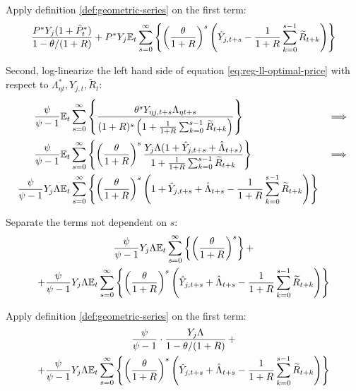 \documentclass[
	thesis.tex
	]{subfiles}
\begin{document}
Apply definition \ref{def:geometric-series} on the first term:
\begin{align}
	\frac{ P^\ast Y_{j} ( 1 + \hat{P}_t^\ast ) }{1-\theta /(1+R)} + P^\ast Y_{j} {\mathbb{E}_{t}} \sum_{s=0}^{\infty} \left\{ \left( \frac{\theta}{1 + R} \right)^s \left( \hat{Y}_{j,t+s} - \frac{1}{1 + R} \sum_{k=0}^{s-1} \widetilde{R}_{t+k} \right) \right\} \nonumber
\end{align}

Second, log-linearize the left hand side of equation \ref{eq:reg-ll-optimal-price} with respect to \( \Lambda_{\eta t}^\ast, Y_{j,t}, \widetilde{R}_t \):
\begin{alignat}{2}
	\frac{\psi}{\psi-1} &{\mathbb{E}_{t}} \sum_{s=0}^{\infty} \left\{ \frac{\theta^s Y_{\eta j,t+s} \Lambda_{\eta t+s}}{ (1 + R)^s \left( 1 + \frac{1}{1 + R} \sum_{k=0}^{s-1} \widetilde{R}_{t+k} \right) } \right\} & \implies \nonumber \\
	\frac{\psi}{\psi-1} &{\mathbb{E}_{t}} \sum_{s=0}^{\infty} \left\{ \left( \frac{\theta}{1 + R} \right)^s \frac{ Y_{j} \Lambda (1+ \hat{Y}_{j,t+s} + \hat{\Lambda}_{t+s}) }{ 1 + \frac{1}{1 + R} \sum_{k=0}^{s-1} \widetilde{R}_{t+k} } \right\} & \implies \nonumber \\
	\frac{\psi}{\psi-1} Y_{j} \Lambda &{\mathbb{E}_{t}} \sum_{s=0}^{\infty} \left\{ \left( \frac{\theta}{1 + R} \right)^s \left( 1+ \hat{Y}_{j,t+s} + \hat{\Lambda}_{t+s} - \frac{1}{1 + R} \sum_{k=0}^{s-1} \widetilde{R}_{t+k} \right) \right\} & \nonumber
\end{alignat}

Separate the terms not dependent on $s$:
\begin{multline}
	\frac{\psi}{\psi-1} Y_{j} \Lambda {\mathbb{E}_{t}} \sum_{s=0}^{\infty} \left\{ \left( \frac{\theta}{1 + R} \right)^s \right\} + 
	\\
	+ \frac{\psi}{\psi-1} Y_{j} \Lambda {\mathbb{E}_{t}} \sum_{s=0}^{\infty} \left\{ \left( \frac{\theta}{1 + R} \right)^s \left( \hat{Y}_{j,t+s} + \hat{\Lambda}_{t+s} - \frac{1}{1 + R} \sum_{k=0}^{s-1} \widetilde{R}_{t+k} \right) \right\} \nonumber
\end{multline}

Apply definition \ref{def:geometric-series} on the first term:
\begin{multline}
	\frac{\psi}{\psi-1} \cdot \frac{Y_{j} \Lambda}{1-\theta /(1+R)} \, + 
	\\
	+ \frac{\psi}{\psi-1} Y_{j} \Lambda {\mathbb{E}_{t}} \sum_{s=0}^{\infty} \left\{ \left( \frac{\theta}{1 + R} \right)^s \left( \hat{Y}_{j,t+s} + \hat{\Lambda}_{t+s} - \frac{1}{1 + R} \sum_{k=0}^{s-1} \widetilde{R}_{t+k} \right) \right\} \nonumber
\end{multline}
\end{document}

